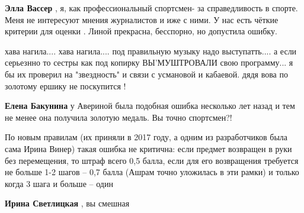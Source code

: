 \begin{itemize}
\begin{itemize}
\textbf{Элла Вассер} , я, как профессиональный спортсмен- за справедливость в
спорте. Меня не интересуют мнения журналистов и иже с ними. У нас есть чёткие
критерии для оценки . Линой прекрасна, бесспорно, но допустила ошибку.

 

хава нагила.... хава нагила.... под правильную музыку надо выступатть.... а если
серьезнно то сестры как под копирку ВЫ'МУШТРОВАЛИ свою программу... я бы их
проверил на "звездность" и связи с усмановой и кабаевой. дядя вова по золотому
ершику не поскупится !


 
\textbf{Елена Бакунина} у Авериной была подобная ошибка несколько лет назад и
тем не менее она получила золотую медаль. Вы точно спортсмен?!

 

По новым правилам (их приняли в 2017 году, а одним из разработчиков была сама
Ирина Винер) такая ошибка не критична: если предмет возвращен в руки без
перемещения, то штраф всего 0,5 балла, если для его возвращения требуется не
больше 1-2 шагов – 0,7 балла (Ашрам точно уложилась в эти рамки) и только когда
3 шага и больше – один

 
\textbf{Ирина Светлицкая} , вы смешная

 

\end{itemize}
\end{itemize}
